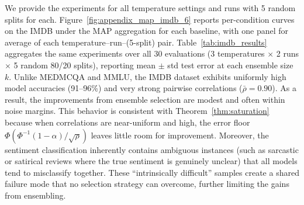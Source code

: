 \documentclass{article}
\theoremstyle{plain}
\theoremstyle{definition}
\theoremstyle{remark}
\begin{document}
We provide the experiments for all temperature settings and runs with 5 random splits for each.
Figure~\ref{fig:appendix_map_imdb_6} reports per-condition curves on the IMDB under the MAP aggregation for each baseline, with one panel for average of each temperature--run--(5-split) pair. Table~\ref{tab:imdb_results} aggregates the same experiments over all $30$ evaluations (3 temperatures $\times$ 2 runs $\times$ 5 random 80/20 splits), reporting mean $\pm$ std test error at each ensemble size $k$. Unlike MEDMCQA and MMLU, the IMDB dataset exhibits uniformly high model accuracies (91--96\%) and very strong pairwise correlations ($\bar{\rho} = 0.90$). As a result, the improvements from ensemble selection are modest and often within noise margins. This behavior is consistent with Theorem~\ref{thm:saturation} because when correlations are near-uniform and high, the error floor $\Phi(\Phi^{-1}(1-\alpha)/\sqrt{\rho})$ leaves little room for improvement. Moreover, the sentiment classification inherently contains ambiguous instances (such as sarcastic or satirical reviews where the true sentiment is genuinely unclear) that all models tend to misclassify together. These ``intrinsically difficult'' samples create a shared failure mode that no selection strategy can overcome, further limiting the gains from ensembling.
\end{document}
